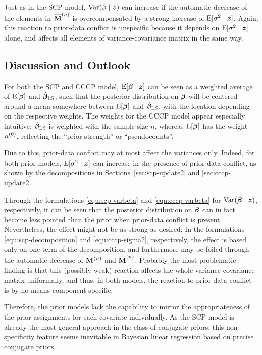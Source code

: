 Just as in the SCP model, $\operatorname{Var}(\beta\mid {\bm z})$ can increase if the automatic decrease of the elements
in $\overline{\mathbf{M}}^{(n)}$ is overcompensated by a strong increase of $\operatorname{E}[\sigma^2\mid{\bm z}]$.
Again, this reaction to prior-data conflict is unspecific
because it depends on $\operatorname{E}[\sigma^2\mid {\bm z}]$ alone,
and affects all elements of variance-covariance matrix in the same way.


\subsection{Discussion and Outlook}
\label{sec:discussion-festschrift}


For both the SCP and CCCP model, $\operatorname{E}[\boldsymbol{\beta}\mid {\bm z}]$ can be seen as a weighted average
of $\operatorname{E}[\boldsymbol{\beta}]$ and $\hat{\boldsymbol{\beta}}_\text{LS}$, such that the posterior distribution on $\boldsymbol{\beta}$ will be
centered around a mean somewhere between $\operatorname{E}[\boldsymbol{\beta}]$ and $\hat{\boldsymbol{\beta}}_\text{LS}$, with the location
depending on the respective weights. The weights for the CCCP model appear especially intuitive:
$\hat{\boldsymbol{\beta}}_\text{LS}$ is weighted with the sample size $n$, whereas $\operatorname{E}[\boldsymbol{\beta}]$ has the weight $n^{(0)}$,
reflecting the ``prior strength'' or ``pseudocounts''.

Due to this, prior-data conflict may at most affect the variances only. Indeed, for both prior models,
$\operatorname{E}[\sigma^2\mid {\bm z}]$ can increase in the presence of prior-data conflict, as shown by the decompositions
in Sections~\ref{sec:scp-update2} and \ref{sec:cccp-update2}.

Through the formulations \eqref{equ:scp-varbeta} and \eqref{equ:cccp-varbeta} for $\operatorname{Var}(\boldsymbol{\beta}\mid {\bm z})$,
respectively, it can be seen that the posterior distribution on $\boldsymbol{\beta}$ can in fact
become less pointed than the prior when prior-data conflict is present.
Nevertheless, the effect might not be as strong as desired: In the formulations
\eqref{equ:scp-decomposition} and \eqref{equ:cccp-sigma2}, respectively, the effect is based only on one term of the decomposition,
and furthermore may be foiled through the automatic decrease of $\mathbf{M}^{(n)}$ and $\overline{\mathbf{M}}^{(n)}$.
Probably the most problematic finding is that this (possibly weak) reaction affects the whole
variance-covariance matrix uniformally, and thus, in both models, the reaction
to prior-data conflict is by no means component-specific.

Therefore, the prior models lack the capability to %
mirror the appropriateness of the prior assignments for each covariate individually.
As the SCP model is already the most general approach in the class of conjugate priors,
this non-specificity feature seems inevitable in Bayesian linear regression based on precise conjugate priors.


